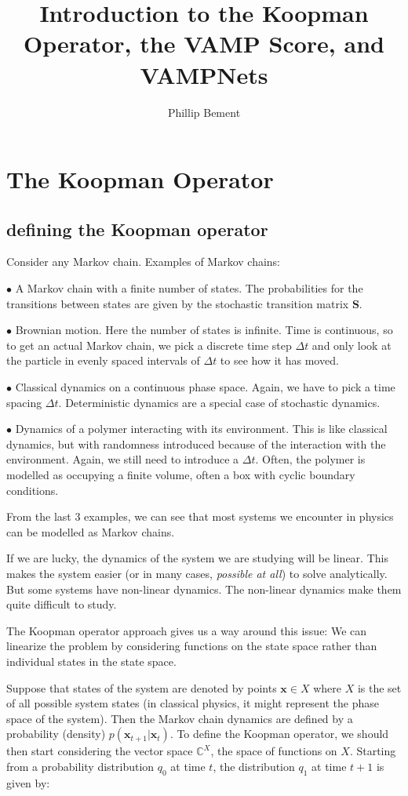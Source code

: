 \documentclass[]{article}
\title{Introduction to the Koopman Operator, the VAMP Score, and VAMPNets}
\author{Phillip Bement}
\newcommand{\w}[1]{\mathbf{#1}}
\newcommand{\CC}{\mathbb{C}}
\begin{document}
\maketitle

\section{The Koopman Operator}

\subsection{defining the Koopman operator}

Consider any Markov chain. Examples of Markov chains:

$\bullet$ A Markov chain with a finite number of states. The probabilities for the transitions between states are given by the stochastic transition matrix $\w{S}$.

$\bullet$ Brownian motion. Here the number of states is infinite. Time is continuous, so to get an actual Markov chain, we pick a discrete time step $\Delta t$ and only look at the particle in evenly spaced intervals of $\Delta t$ to see how it has moved.

$\bullet$ Classical dynamics on a continuous phase space. Again, we have to pick a time spacing $\Delta t$. Deterministic dynamics are a special case of stochastic dynamics.

$\bullet$ Dynamics of a polymer interacting with its environment. This is like classical dynamics, but with randomness introduced because of the interaction with the environment. Again, we still need to introduce a $\Delta t$. Often, the polymer is modelled as occupying a finite volume, often a box with cyclic boundary conditions.

From the last 3 examples, we can see that most systems we encounter in physics can be modelled as Markov chains.

If we are lucky, the dynamics of the system we are studying will be linear. This makes the system easier (or in many cases, {\em possible at all}) to solve analytically. But some systems have non-linear dynamics. The non-linear dynamics make them quite difficult to study.

The Koopman operator approach gives us a way around this issue: We can linearize the problem by considering functions on the state space rather than individual states in the state space.

Suppose that states of the system are denoted by points $\w{x}\in X$ where $X$ is the set of all possible system states (in classical physics, it might represent the phase space of the system). Then the Markov chain dynamics are defined by a probability (density) $p(\w{x}_{t+1}|\w{x}_{t})$. To define the Koopman operator, we should then start considering the vector space $\CC^X$, the space of functions on $X$. Starting from a probability distribution $q_0$ at time $t$, the distribution $q_1$ at time $t+1$ is given by:
\end{document}
